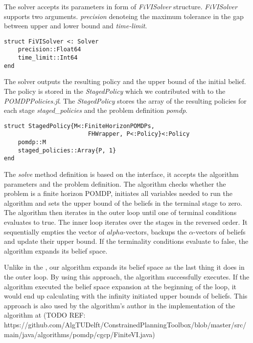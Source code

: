 The solver accepts its parameters in form of \textit{FiVISolver} structure. \textit{FiVISolver} supports two arguments. \textit{precision} denoteing the maximum tolerance in the gap between upper and lower bound and \textit{time-limit}.

\begin{samepage}
\begin{verbatim}
struct FiVISolver <: Solver
    precision::Float64
    time_limit::Int64
end
\end{verbatim}
\end{samepage}



The solver outputs the resulting policy and the upper bound of the initial belief. The policy is stored in the \textit{StagedPolicy} which we contributed with to the \textit{POMDPPolicies.jl}. The \textit{StagedPolicy} stores the array of the resulting policies for each stage \textit{staged\_policies} and the problem definition \textit{pomdp}. 


\begin{samepage}
\begin{verbatim}
struct StagedPolicy{M<:FiniteHorizonPOMDPs,
                        FHWrapper, P<:Policy}<:Policy
    pomdp::M
    staged_policies::Array{P, 1}
end
\end{verbatim}
\end{samepage}



The \textit{solve} method definition is based on the interface, it accepts the algorithm parameters and the problem definition. The algorithm checks whether the problem is a finite horizon POMDP, initiates all variables needed to run the algorithm and sets the upper bound of the beliefs in the terminal stage to zero. The algorithm then iterates in the outer loop until one of terminal conditions evaluates to true. The inner loop iterates over the stages in the reversed order. It sequentially empties the vector of $alpha$-vectors, backups the $\alpha$-vectors of beliefs and update their upper bound. If the terminality conditions evaluate to false, the algorithm expands its belief space.

Unlike in the \cite{Walraven19}, our algorithm expands its belief space as the last thing it does in the outer loop. By using this approach, the algorithm successfully executes. If the algorithm executed the belief space expansion at the beginning of the loop, it would end up calculating with the infinity initiated upper bounds of beliefs. This approach is also used by the algorithm's author in the implementation of the algorithm at (TODO REF: https://github.com/AlgTUDelft/ConstrainedPlanningToolbox/blob/master/src/main/java/algorithms/pomdp/cgcp/FiniteVI.java)




